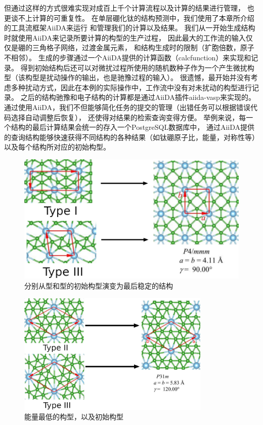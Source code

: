 但通过这样的方式很难实现对成百上千个计算流程以及计算的结果进行管理，
也更谈不上计算的可重复性。
在单层硼化钛的结构预测中，我们使用了本章所介绍的工具流框架AiiDA来运行
和管理我们的计算以及结果。
我们从一开始生成结构时就使用AiiDA来记录所要计算的构型的生产过程，
因此最大的工作流的输入仅仅是硼的三角格子网络，过渡金属元素，
和结构生成时的限制（扩胞倍数，原子不相邻）。
生成的步骤通过一个AiiDA提供的计算函数（calcfunction）来实现和记录。
得到初始结构后还可以对微扰过程所使用的随机数种子作为一个产生微扰构型（该构型是扰动操作的输出，也是驰豫过程的输入）。
很遗憾，最开始并没有考虑多种扰动方式，因此在本例的实际操作中，工作流中没有对未扰动的构型进行记录。
之后的结构驰豫和电子结构的计算都是通过AiiDA插件aiida-vasp\cite{aiida-vasp}来实现的。
通过使用AiiDA，我们不但能够简化任务的提交的管理（出错任务可以根据错误代码选择自动调整后恢复），
还使得对结果的检索查询变得方便。
举例来说，每一个结构的最后计算结果会统一的存入一个PostgreSQL数据库中，
通过AiiDA提供的查询结构能够快速获得不同结构的各种结果（如钛硼原子比，能量，对称性等）
以及每个结构所对应的初始构型。

\begin{figure}
  \includegraphics[width=1.0\textwidth]{figs/ch5_cell_change.png}
  \centering
  \caption{分别从型和型的初始构型演变为最后稳定的结构}
  \label{fig:ch5_cell_change}
\end{figure}

\begin{figure}
  \includegraphics[width=0.82\textwidth]{figs/ch5_tib9.png}
  \centering
  \caption{能量最低的构型，以及初始构型}
  \label{fig:ch5_tib9}
\end{figure}

